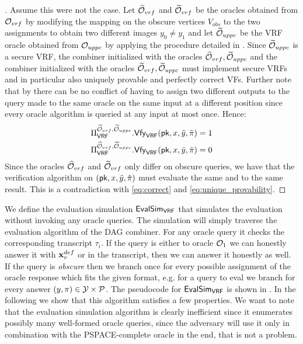 \begin{proof}[]
Assume this were not the case. Let $\widehat{\mathcal{O}}_{vrf}$ and $\widetilde{\mathcal{O}}_{vrf}$ be the oracles obtained from
$\mathcal{O}_{vrf}$ by modifying the mapping on the obscure vertices $V_{obs}$ to the two assignments to obtain two different 
images $y_0\neq y_1$ and let $\widetilde{\mathcal{O}}_{uppc}$ be the VRF oracle obtained from $\mathcal{O}_{uppc}$ by applying the procedure 
detailed in .
Since $\widetilde{\mathcal{O}}_{uppc}$ is a secure VRF, the combiner initialized with the oracles $\widehat{\mathcal{O}}_{vrf}, \widetilde{\mathcal{O}}_{uppc}$ and the combiner
initialized with the oracles $\widetilde{\mathcal{O}}_{vrf}, \widetilde{\mathcal{O}}_{uppc}$ must implement secure VRFs
and in particular also uniquely provable and perfectly correct VFs. Further note that by 
there can be no conflict of having to assign two different outputs to the query made to the same oracle on the same input
at a different position since every oracle algorithm is queried at any input at most once. Hence:
\begin{align}
	\BBComb{VRF}[\widetilde\O_{vrf}, \widetilde\O_{uppc}].\alg{Vfy}{VRF}(\pk, x, \tilde y, \tilde\pi) = 1 \label{eq:correct}\\ 
	\BBComb{VRF}[\widehat\O_{vrf}, \widetilde\O_{uppc}].\alg{Vfy}{VRF}(\pk, x, \tilde y, \tilde\pi) = 0 \label{eq:unique_provability}
\end{align}
Since the oracles $\widehat{\mathcal{O}}_{vrf}$ and $\widetilde{\mathcal{O}}_{vrf}$ only differ on obscure queries, we have that the verification algorithm
on $(\textup{\textsf{pk}}, x, \tilde y, \tilde \pi)$ must evaluate the same and to the same result. This is a contradiction with 
\eqref{eq:correct} and \eqref{eq:unique_provability}.
\end{proof}

We define the evaluation simulation $\alg{EvalSim}{VRF}$ that simulates the evaluation 
without invoking any oracle queries. The simulation will simply traverse the evaluation algorithm 
of the DAG combiner. For any oracle query it checks the corresponding transcript $\tau_i$.
If the query is either to oracle $\mathcal{O}_1$ we can honestly answer it with $\mathbf{x}_v^{def}$ or in the transcript, 
then we can answer it honestly as well. If the query is \textit{obscure} then we branch once for every possible 
assignment of the oracle response which fits the given format, e.g. for a query to eval we branch 
for every answer $(y,\pi) \in \mathcal{Y} \times \mathcal{P}$. The pseudocode for $\alg{EvalSim}{VRF}$ is shown in .
In the following we show that this algorithm satisfies a few properties. We want to note that the evaluation simulation algorithm 
is clearly inefficient since it enumerates possibly many well-formed oracle queries, since the adversary will use it only in combination
with the PSPACE-complete oracle in the end, that is not a problem.

